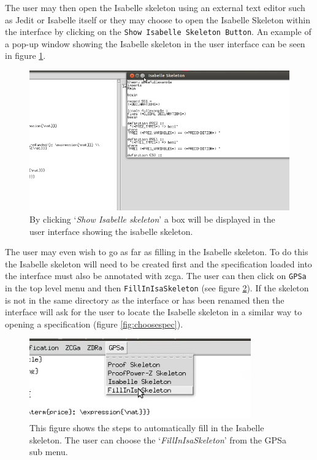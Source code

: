 The user may then open the Isabelle skeleton using an external text editor such
as Jedit or Isabelle itself or they may choose to open the Isabelle Skeleton
within the interface by clicking on the \texttt{Show Isabelle Skeleton Button}.
An example of a pop-up window showing the Isabelle skeleton in the user
interface can be seen in figure \ref{fig:isaskelpopup}.

\begin{figure}[H]
\centering
\includegraphics[scale=0.5]{Figures/Interface/isaskelpopup.png}
\caption{By clicking `\textit{Show Isabelle skeleton}' a box will be displayed in the user interface showing the isabelle skeleton. \label{fig:isaskelpopup}}
\end{figure}

The user may even wish to go as far as filling in the Isabelle skeleton. To do
this the Isabelle skeleton will need to be created first and the specification
loaded into the interface must also be annotated with \gls{zcga}. The user can
then click on \texttt{GPSa} in the top level menu and then
\texttt{FillInIsaSkeleton} (see figure \ref{fig:fillinisaskel}). If the skeleton
is not in the same directory as the interface or has been renamed then the
interface will ask for the user to locate the Isabelle skeleton in a similar way
to opening a specification (figure \ref{fig:choosespec}).

\begin{figure}[H]
\centering
\includegraphics[scale=0.7]{Figures/Interface/fillinisaskel.png}
\caption{This figure shows the steps to automatically fill in the Isabelle skeleton. The user can choose the `\textit{FillInIsaSkeleton}' from the GPSa sub menu. \label{fig:fillinisaskel}}
\end{figure}

